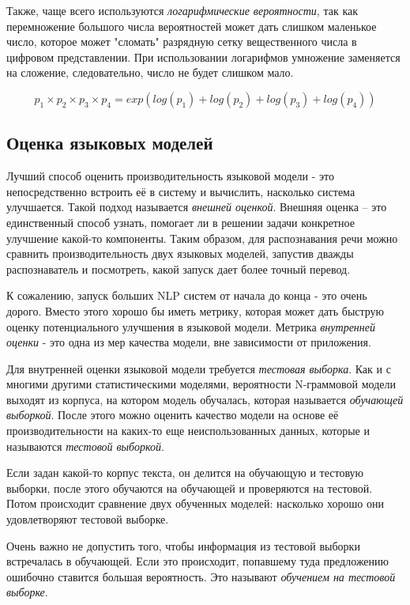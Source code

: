 \documentclass[a4paper,12pt,preview]{report} %
\begin{document}
	Также, чаще всего используются \textit{логарифмические вероятности}, так как перемножение большого числа вероятностей может дать слишком маленькое число, которое может "сломать" разрядную сетку вещественного числа в цифровом представлении. При использовании логарифмов умножение заменяется на сложение, следовательно, число не будет слишком мало.
	
	
	\begin{equation}
		p_1 \times p_2 \times p_3 \times p_4 = exp(log(p_1) + log(p_2) + log(p_3) + log(p_4))
	\end{equation}
	
	\subsection{Оценка языковых моделей}
	Лучший способ оценить производительность языковой модели - это непосредственно встроить её в систему и вычислить, насколько система улучшается. Такой подход называется \textit{внешней оценкой}. Внешняя оценка -- это единственный способ узнать, помогает ли в решении задачи конкретное улучшение какой-то компоненты. Таким образом, для распознавания речи можно сравнить производительность двух языковых моделей, запустив дважды распознаватель и посмотреть, какой запуск дает более точный перевод.
	
	К сожалению, запуск больших NLP систем от начала до конца - это очень дорого. Вместо этого хорошо бы иметь метрику, которая может дать быструю оценку потенциального улучшения в языковой модели. Метрика \textit{внутренней оценки} - это одна из мер качества модели, вне зависимости от приложения. 
	
	Для внутренней оценки языковой модели требуется \textit{тестовая выборка}. Как и с многими другими статистическими моделями, вероятности N-граммовой модели выходят из корпуса, на котором модель обучалась, которая называется \textit{обучающей выборкой}. После этого можно оценить качество модели на основе её производительности на каких-то еще неиспользованных данных, которые и называются \textit{тестовой выборкой}.
	
	Если задан какой-то корпус текста, он делится на обучающую и тестовую выборки, после этого обучаются на обучающей и проверяются на тестовой. Потом происходит сравнение двух обученных моделей: насколько хорошо они удовлетворяют тестовой выборке.
	
	Очень важно не допустить того, чтобы информация из тестовой выборки встречалась в обучающей. Если это происходит, попавшему туда предложению ошибочно ставится большая вероятность. Это называют \textit{обучением на тестовой выборке}. 
	
\end{document}
